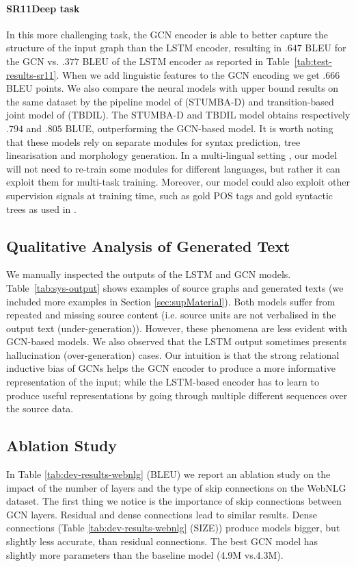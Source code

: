 \documentclass[11pt,a4paper,dvipsnames]{article}
\begin{document}
\paragraph{SR11Deep task}
In this more challenging task, the GCN encoder is able to better capture the structure of the input graph than the LSTM encoder, resulting in $.647$ BLEU for the GCN vs. $.377$ BLEU of the LSTM encoder as reported in Table~\ref{tab:test-results-sr11}.
When we add linguistic features to the GCN encoding we get $.666$ BLEU points.
We also compare the neural models with upper bound results on the same dataset by
the pipeline model of  
(STUMBA-D) and transition-based joint model of  (TBDIL).
The STUMBA-D and TBDIL model obtains respectively $.794$ and $.805$ BLUE, outperforming the GCN-based model.
It is worth noting that these models rely on separate modules for 
syntax prediction, tree linearisation and morphology generation.
In a multi-lingual setting \cite{mille2017shared},
our model will not need to re-train some modules for different languages, 
but rather it can exploit them for multi-task training.
Moreover, our model could also exploit other supervision signals at training time, 
such as gold POS tags and gold syntactic trees as used in .



\subsection{Qualitative Analysis of Generated Text}
We manually inspected the outputs of the LSTM and GCN models.
Table~\ref{tab:sys-output} shows examples of source graphs and generated texts 
(we included more examples in Section \ref{sec:supMaterial}).
Both models suffer from repeated and missing source content (i.e. source 
units are not verbalised in the output text (under-generation)).
However, these phenomena are less evident with GCN-based models. 
We also observed that the LSTM output sometimes presents hallucination 
(over-generation) cases.
Our intuition is that the strong relational inductive bias of GCNs \cite{battaglia2018relational} helps the GCN encoder to produce a more informative representation of the input; while the LSTM-based encoder has to learn to produce useful representations by going through multiple different sequences over the source data.


\subsection{Ablation Study}
In Table \ref{tab:dev-results-webnlg} (BLEU) we report an ablation study on the impact of the number of layers and the type of skip connections on the WebNLG dataset.
The first thing we notice is the importance of skip connections between GCN layers.
Residual and dense connections lead to similar results.
Dense connections (Table \ref{tab:dev-results-webnlg} (SIZE)) produce models bigger, but slightly less accurate, than residual connections.
The best GCN model has slightly more parameters than the baseline model (4.9M vs.4.3M).
\end{document}
